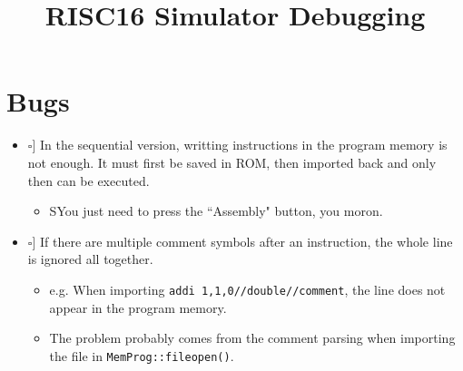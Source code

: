 \documentclass[12pt,a4paper]{extarticle}
\title{RISC16 Simulator Debugging}
\newcommand{\done}{\makebox[0pt][l]{$\square$}\raisebox{.15ex}{\hspace{0.1em}$\checkmark$}}%
\begin{document}
\maketitle

\section{Bugs}

\begin{itemize}
  \item[\done] In the sequential version, writting instructions in the program memory is not enough.
  It must first be saved in ROM, then imported back and only then can be executed.
  \begin{itemize}
    \item SYou just need to press the ``Assembly" button, you moron.
  \end{itemize}

  \item[\done] If there are multiple comment symbols after an instruction, the whole line is ignored all together.
  \begin{itemize}
    \item e.g. When importing \texttt{addi 1,1,0//double//comment}, the line does not appear in the program memory.
    \item The problem probably comes from the comment parsing when importing the file in \texttt{MemProg::fileopen()}.
  \end{itemize}


\end{itemize}
\end{document}
